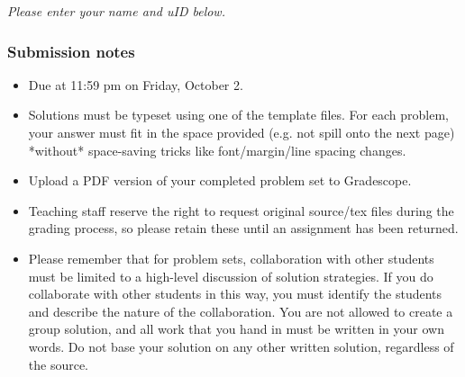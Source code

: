 \documentclass{article}
\begin{document}
{\it Please enter your name and uID below.}

\vspace{3em}

\par
{}
\par

\vfill

\subsubsection*{Submission notes}
\begin{itemize}
  \item Due at 11:59 pm on Friday, October 2.
  \item Solutions must be typeset using one of the template files. For each problem, your answer must fit
    in the space provided (e.g. not spill onto the next page) *without* space-saving tricks
    like font/margin/line spacing changes.
  \item Upload a PDF version of your completed problem set to Gradescope.
  \item Teaching staff reserve the right to request original source/tex files during the grading process, so please retain these until an assignment has been returned.
  \item Please remember that for problem sets, collaboration with other students must be limited to a high-level discussion of solution strategies. If you do collaborate with other students in this way, you must identify the students and describe the nature of the collaboration. You are not allowed to create a group solution, and all work that you hand in must be written in your own words. Do not base your solution on any other written solution, regardless of the source.
\end{itemize}

\pagebreak
\end{document}
